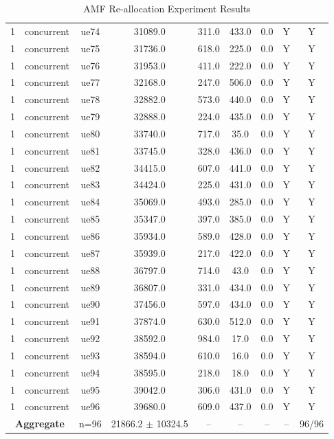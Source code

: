 \begin{table}[ht]
\begin{tabular}{|c|c|c|c|c|c|c|c|c|}
1 & concurrent & ue74 & 31089.0 & 311.0 & 433.0 & 0.0 & Y & Y \\
1 & concurrent & ue75 & 31736.0 & 618.0 & 225.0 & 0.0 & Y & Y \\
1 & concurrent & ue76 & 31953.0 & 411.0 & 222.0 & 0.0 & Y & Y \\
1 & concurrent & ue77 & 32168.0 & 247.0 & 506.0 & 0.0 & Y & Y \\
1 & concurrent & ue78 & 32882.0 & 573.0 & 440.0 & 0.0 & Y & Y \\
1 & concurrent & ue79 & 32888.0 & 224.0 & 435.0 & 0.0 & Y & Y \\
1 & concurrent & ue80 & 33740.0 & 717.0 & 35.0 & 0.0 & Y & Y \\
1 & concurrent & ue81 & 33745.0 & 328.0 & 436.0 & 0.0 & Y & Y \\
1 & concurrent & ue82 & 34415.0 & 607.0 & 441.0 & 0.0 & Y & Y \\
1 & concurrent & ue83 & 34424.0 & 225.0 & 431.0 & 0.0 & Y & Y \\
1 & concurrent & ue84 & 35069.0 & 493.0 & 285.0 & 0.0 & Y & Y \\
1 & concurrent & ue85 & 35347.0 & 397.0 & 385.0 & 0.0 & Y & Y \\
1 & concurrent & ue86 & 35934.0 & 589.0 & 428.0 & 0.0 & Y & Y \\
1 & concurrent & ue87 & 35939.0 & 217.0 & 422.0 & 0.0 & Y & Y \\
1 & concurrent & ue88 & 36797.0 & 714.0 & 43.0 & 0.0 & Y & Y \\
1 & concurrent & ue89 & 36807.0 & 331.0 & 434.0 & 0.0 & Y & Y \\
1 & concurrent & ue90 & 37456.0 & 597.0 & 434.0 & 0.0 & Y & Y \\
1 & concurrent & ue91 & 37874.0 & 630.0 & 512.0 & 0.0 & Y & Y \\
1 & concurrent & ue92 & 38592.0 & 984.0 & 17.0 & 0.0 & Y & Y \\
1 & concurrent & ue93 & 38594.0 & 610.0 & 16.0 & 0.0 & Y & Y \\
1 & concurrent & ue94 & 38595.0 & 218.0 & 18.0 & 0.0 & Y & Y \\
1 & concurrent & ue95 & 39042.0 & 306.0 & 431.0 & 0.0 & Y & Y \\
1 & concurrent & ue96 & 39680.0 & 609.0 & 437.0 & 0.0 & Y & Y \\
\multicolumn{2}{|c|}{\textbf{Aggregate}} & n=96 & 21866.2 $\pm$ 10324.5 & -- & -- & -- & -- & 96/96 \\
\hline
\end{tabular}
\caption{AMF Re-allocation Experiment Results}
\label{tab:amf_realloc}
\end{table}
